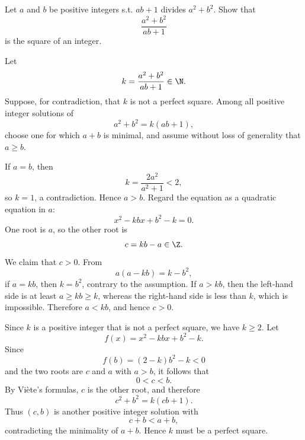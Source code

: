 
    \begin{expectedproblem}
        Let $a$ and $b$ be positive integers s.t. $ab+1$ divides
        $a^2+b^2$. Show that
        \[
            \frac{a^2+b^2}{ab+1}
        \]
        is the square of an integer.
    \end{expectedproblem}

    \begin{solution}
        Let
        \[
            k=\frac{a^2+b^2}{ab+1}\in\N.
        \]
        Suppose, for contradiction, that $k$ is not a perfect square. Among all
        positive integer solutions of
        \[
            a^2+b^2=k(ab+1),
        \]
        choose one for which $a+b$ is minimal, and assume without loss of
        generality that $a\geq b$.

        If $a=b$, then
        \[
            k=\frac{2a^2}{a^2+1}<2,
        \]
        so $k=1$, a contradiction. Hence $a>b$. Regard the equation as a
        quadratic equation in $a$:
        \[
            x^2-kbx+b^2-k=0.
        \]
        One root is $a$, so the other root is
        \[
            c=kb-a\in\Z.
        \]
        We claim that $c>0$. From
        \[
            a(a-kb)=k-b^2,
        \]
        if $a=kb$, then $k=b^2$, contrary to the assumption. If $a>kb$, then
        the left-hand side is at least $a\geq kb\geq k$, whereas the
        right-hand side is less than $k$, which is impossible. Therefore
        $a<kb$, and hence $c>0$.

        Since $k$ is a positive integer that is not a perfect square, we have
        $k\geq2$. Let
        \[
            f(x)=x^2-kbx+b^2-k.
        \]
        Since
        \[
            f(b)=(2-k)b^2-k<0
        \]
        and the two roots are $c$ and $a$ with $a>b$, it follows that
        \[
            0<c<b.
        \]
        By Vi\`ete's formulas, $c$ is the other root, and therefore
        \[
            c^2+b^2=k(cb+1).
        \]
        Thus $(c,b)$ is another positive integer solution with
        \[
            c+b<a+b,
        \]
        contradicting the minimality of $a+b$. Hence $k$ must be a perfect
        square.
    \end{solution}

